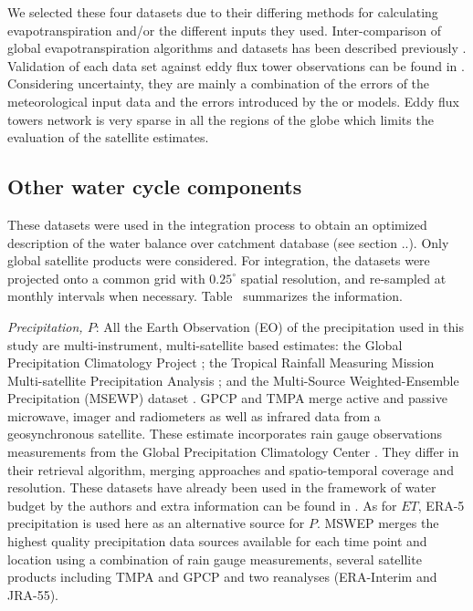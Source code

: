 \documentclass[draft]{agujournal2019}
\begin{document}
We selected these four datasets due to their differing methods for calculating evapotranspiration and/or the different inputs they used. Inter-comparison of global evapotranspiration algorithms and datasets has been described previously \cite{Michel2016}. Validation of each data set against eddy flux tower observations can be found in \cite{Miralles2011,Mu2011}. Considering uncertainty, they are mainly a combination of the errors of the meteorological input data and the errors introduced by the \cite{PRIESTLEY1972} or \cite{PENMAN1948,Monteith1965} models. Eddy flux towers network is very sparse in all the regions of the globe which limits the evaluation of the satellite estimates.




\subsection{Other water cycle components}

These datasets were used in the integration process to obtain an optimized description of the water balance over catchment database (see section ..). Only global satellite products were considered. For integration, the datasets were projected onto a common grid with $0.25^\circ$ spatial resolution, and re-sampled at monthly intervals when necessary. Table~\label{table1} summarizes the information. 


{\it Precipitation, $P$}: All the Earth Observation (EO) of the precipitation used in this study are multi-instrument, multi-satellite based estimates: the Global Precipitation Climatology Project \cite{Adler2003}; the Tropical Rainfall Measuring Mission Multi-satellite Precipitation Analysis \cite{Huffman2007};  and the Multi-Source Weighted-Ensemble Precipitation (MSEWP) dataset \cite{Beck2017}. GPCP and TMPA merge active and passive microwave,  imager and radiometers  as well as infrared data from a geosynchronous satellite. These estimate incorporates rain gauge observations measurements from the Global Precipitation Climatology Center \cite{Schneider2011, Schneider2014b}. They differ in their retrieval algorithm, merging approaches and spatio-temporal coverage and resolution. These datasets have already been used in the framework of water budget by the authors and extra information can be found in \cite{Pellet2020c}. As for $ET$, ERA-5 precipitation is used here as an alternative source for $P$. MSWEP merges the highest quality precipitation data sources available for each time point and location using a combination of rain gauge measurements, several satellite products including TMPA and GPCP and two reanalyses (ERA-Interim and JRA-55). 
\end{document}
